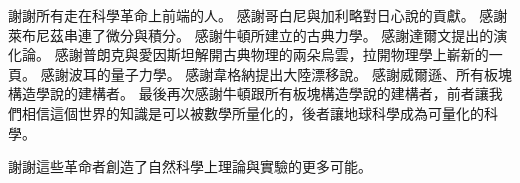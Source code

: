 
\begin{acknowledgement}

謝謝所有走在科學革命上前端的人。
感謝哥白尼與加利略對日心說的貢獻。
感謝萊布尼茲串連了微分與積分。 
感謝牛頓所建立的古典力學。
感謝達爾文提出的演化論。
感謝普朗克與愛因斯坦解開古典物理的兩朵烏雲，拉開物理學上嶄新的一頁。
感謝波耳的量子力學。
感謝韋格納提出大陸漂移說。
感謝威爾遜、所有板塊構造學說的建構者。
最後再次感謝牛頓跟所有板塊構造學說的建構者，前者讓我們相信這個世界的知識是可以被數學所量化的，後者讓地球科學成為可量化的科學。

謝謝這些革命者創造了自然科學上理論與實驗的更多可能。
  

\end{acknowledgement}